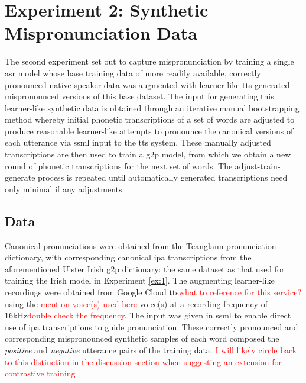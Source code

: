 \documentclass[thesis]{cluu}
\newcommand{\todo}[1]{\textcolor{red}{#1}}
\begin{document}
\section{Experiment 2: Synthetic Mispronunciation Data}
The second experiment set out to capture mispronunciation by training a single \gls{asr} model whose base training data of more readily available, correctly pronounced native-speaker data was augmented with learner-like \gls{tts}-generated mispronounced versions of this base dataset. The input for generating this learner-like synthetic data is obtained through an iterative manual bootstrapping method whereby initial phonetic transcriptions of a set of words are adjusted to produce reasonable learner-like attempts to pronounce the canonical versions of each utterance via \gls{ssml} input to the \gls{tts} system. These manually adjusted transcriptions are then used to train a \gls{g2p} model, from which we obtain a new round of phonetic transcriptions for the next set of words. The adjust-train-generate process is repeated until automatically generated transcriptions need only minimal if any adjustments.

\subsection{Data} 
Canonical pronunciations were obtained from the Teanglann pronunciation dictionary, with corresponding canonical \gls{ipa} transcriptions from the aforementioned Ulster Irish \gls{g2p} dictionary: the same dataset as that used for training the Irish model in Experiment \ref{ex:1}. The augmenting learner-like recordings were obtained from Google Cloud \acrlong{tts}\todo{what to reference for this service?} using the \todo{mention voice(s) used here} voice(s) at a recording frequency of 16kHz\todo{double check the frequency}. The input was given in \gls{ssml} to enable direct use of \gls{ipa} transcriptions to guide pronunciation. These correctly pronounced and corresponding mispronounced synthetic samples of each word composed the \textit{positive} and \textit{negative} utterance pairs of the training data. \todo{I will likely circle back to this distinction in the discussion section when suggesting an extension for contrastive training}
\end{document}
